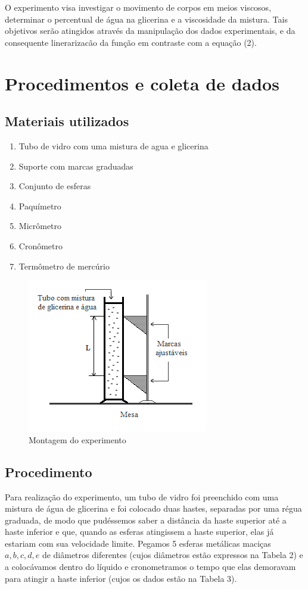 \documentclass[english,brazil]{article}
\begin{document}
	O experimento visa investigar o movimento de corpos em meios viscosos, determinar o percentual de água na glicerina e a viscosidade da mistura. Tais objetivos serão atingidos através da manipulação dos dados experimentais, e da consequente linerarizacão da função em contraste com a equação (2).


\section{Procedimentos e coleta de dados}


	\subsection{Materiais utilizados}
		\begin{enumerate}
			\item Tubo de vidro com uma mistura de agua e glicerina 
			\item Suporte com marcas graduadas 
			\item Conjunto de esferas 
			\item Paquímetro 
			\item Micrômetro 
			\item Cronômetro 
			\item Termômetro de mercúrio 
		\end{enumerate}

	\begin{figure}[!ht]
		\centering
		\includegraphics[scale=0.8]{arranjo-experimental.png}
		\caption{Montagem do experimento}
	\end{figure}

	\subsection{Procedimento}

		Para realização do experimento, um tubo de vidro foi preenchido com uma mistura de água de glicerina e foi colocado duas hastes, separadas por uma régua graduada, de modo que pudéssemos saber a distância da haste superior até a haste inferior e que, quando as esferas atingissem a haste superior, elas já estariam com sua velocidade limite. Pegamos 5 esferas metálicas maciças $a,b,c,d,e$ de diâmetros diferentes (cujos diâmetros estão expressos na Tabela 2) e a colocávamos dentro do líquido e cronometramos o tempo que elas demoravam para atingir a haste inferior (cujos os dados estão na Tabela 3).
		
\end{document}
